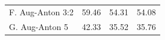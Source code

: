 \documentclass[aspectratio=1610]{beamer} %
\begin{document}
\begin{frame}
\begin{table}[htbp]
{\begin{tabular}{|l|rrr|}
F. Aug-Anton 3:2 & 59.46                                                    & 54.31                                                 & 54.08                                                     \\
G. Aug-Anton 5  & 42.33                                                    & 35.52                                                     & 35.76                                                      \\
\hline
\end{tabular}
}
\label{fig:results}
\end{table}
\end{frame}


\end{document}
